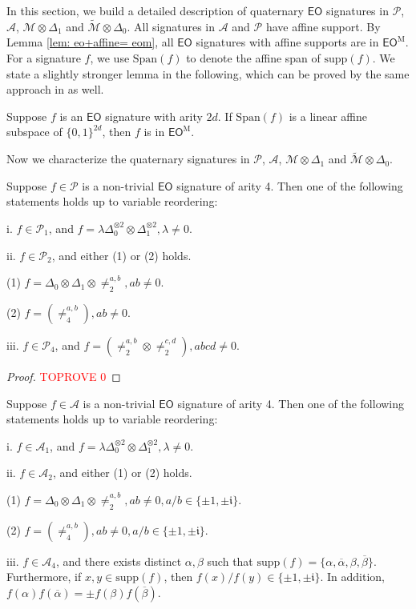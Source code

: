 \documentclass[a4paper,UKenglish,cleveref, autoref, thm-restate]{lipics-v2021}
\newcommand{\eo}[0]{\textsf{EO}}
\newcommand{\su}[0]{\text{supp}}
\newcommand{\eom}[1][\text{M}]{\textsf{EO}^{#1}}
\begin{document}
In this section, we build a detailed description of quaternary $\eo$ signatures in $\mathscr{P}$, $\mathscr{A}$, $\mathscr{M}\otimes\Delta_1$ and $\widetilde{\mathscr{M}}\otimes\Delta_0$.
All signatures in $\mathscr{A}$ and $\mathscr{P}$ have affine support. By Lemma \ref{lem: eo+affine= eom}, all $\eo$ signatures with affine supports are in $\eom$. For a signature $f$, we use $\text{Span}(f)$ to denote the affine span of $\su(f)$. We state a slightly stronger lemma in the following, which can be proved by the same approach in \cite[Lemma 5.7]{cai2020beyond} as well.

\begin{lemma}\cite{cai2020beyond} \label{lemmaaffineeosupport}
Suppose $f$ is an $\eo$ signature with arity $2d$. If $\text{Span}(f)$ is a linear affine subspace of $\{0,1\}^{2d}$, then $f$ is in $\eom$.

\end{lemma}

Now we characterize the quaternary signatures in $\mathscr{P}$, $\mathscr{A}$, $\mathscr{M}\otimes\Delta_1$ and $\widetilde{\mathscr{M}}\otimes\Delta_0$.

\begin{lemma}\label{lem:arity4inP}
Suppose $f\in \mathscr{P}$ is a non-trivial $\eo$ signature of arity 4. Then one of the following statements holds up to variable reordering:

i. $f\in\mathscr{P}_1$, and $f=\lambda\Delta_0^{\otimes2}\otimes\Delta_1^{\otimes2},\lambda\neq0$. 

ii. $f\in\mathscr{P}_2$, and either (1) or (2) holds.

(1) $f=\Delta_0\otimes\Delta_1\otimes\neq_2^{a,b},ab\neq 0$. 

(2) $f=(\neq_4^{a,b}), ab\neq0.$

iii. $f\in\mathscr{P}_4$, and $f=(\neq_2^{a,b}\otimes\neq_2^{c,d}), abcd\neq0$.
\end{lemma}
\begin{proof}\textcolor{red}{TOPROVE 0}\end{proof}

\begin{lemma}\label{lem:arity4inA}
Suppose $f\in \mathscr{A}$ is a non-trivial $\eo$ signature of arity 4. Then one of the following statements holds up to variable reordering:

i. $f\in\mathscr{A}_1$, and $f=\lambda\Delta_0^{\otimes2}\otimes\Delta_1^{\otimes2},\lambda\neq0$. 

ii. $f\in\mathscr{A}_2$, and either (1) or (2) holds.

(1) $f=\Delta_0\otimes\Delta_1\otimes\neq_2^{a,b}, ab\neq0, a/b\in\{\pm1,\pm\mathfrak{i}\}$.

(2) $f=(\neq_4^{a,b}), ab\neq0, a/b\in\{\pm1,\pm\mathfrak{i}\}$.

iii. $f\in\mathscr{A}_4$, and there exists distinct $\alpha,\beta$ such that  $\su(f)=\{\alpha,\overline{\alpha},\beta,\overline{\beta}\}$. Furthermore, if $x,y\in\su(f)$, then $f(x)/f(y)\in\{\pm1,\pm\mathfrak{i}\}$. In addition, $f(\alpha)f(\overline{\alpha})=\pm f(\beta)f(\overline{\beta})$.

\end{lemma}
\end{document}
